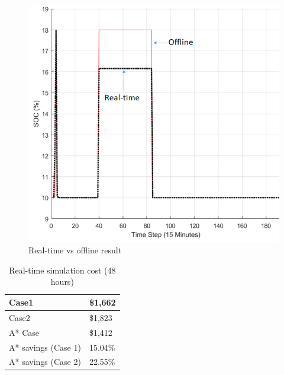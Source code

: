 \begin{figure}[!ht]
    \centering
    \includegraphics[width = \linewidth]{figs/RT_TESTING.png}
    \caption{Real-time vs offline result}
    \label{fig:RT_TESTING}
\end{figure}



\begin{table}[htb]
\centering
\caption{Real-time simulation cost (48 hours)}
\label{tab:rt_cost}
\begin{tabular}{|l|l|}
\hline
Case1               & \$1,662 \\ \hline
Case2                & \$1,823 \\ \hline
A* Case             & \$1,412 \\ \hline
A* savings (Case 1) & 15.04\% \\ \hline
A* savings (Case 2) & 22.55\% \\ \hline
\end{tabular}
\end{table}